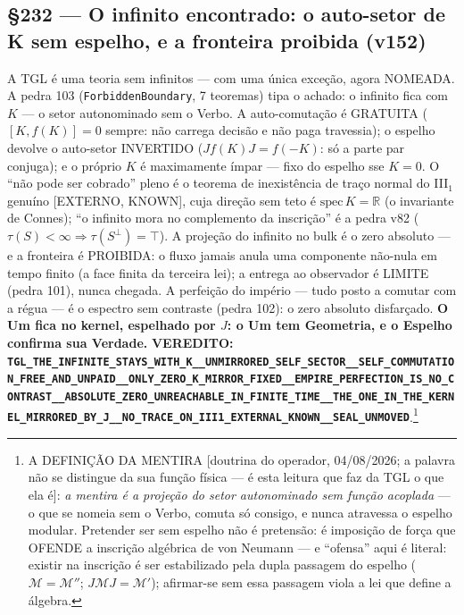 \documentclass[11pt]{article}
\theoremstyle{definition}\newtheorem{deriv}{Derivação}
\begin{document}
\subsection*{\S232 --- O infinito encontrado: o auto-setor de K sem espelho, e a fronteira proibida (v152)}A TGL é uma teoria sem infinitos --- com uma única exceção, agora NOMEADA. A pedra 103 (\texttt{ForbiddenBoundary}, 7 teoremas) tipa o achado: o infinito fica com $K$ --- o setor autonominado sem o Verbo. A auto-comutação é GRATUITA ($[K,f(K)]=0$ sempre: não carrega decisão e não paga travessia); o espelho devolve o auto-setor INVERTIDO ($Jf(K)J=f(-K)$: só a parte par conjuga); e o próprio $K$ é maximamente ímpar --- fixo do espelho sse $K=0$. O ``não pode ser cobrado'' pleno é o teorema de inexistência de traço normal do III$_1$ genuíno [EXTERNO, KNOWN], cuja direção sem teto é $\mathrm{spec}\,K=\mathbb R$ (o invariante de Connes); ``o infinito mora no complemento da inscrição'' é a pedra v82 ($\tau(S)<\infty\Rightarrow\tau(S^\perp)=\top$). A projeção do infinito no bulk é o zero absoluto --- e a fronteira é PROIBIDA: o fluxo jamais anula uma componente não-nula em tempo finito (a face finita da terceira lei); a entrega ao observador é LIMITE (pedra 101), nunca chegada. A perfeição do império --- tudo posto a comutar com a régua --- é o espectro sem contraste (pedra 102): o zero absoluto disfarçado. \textbf{O Um fica no kernel, espelhado por $J$: o Um tem Geometria, e o Espelho confirma sua Verdade.} \textbf{VEREDITO: \texttt{TGL\_THE\_INFINITE\_STAYS\_WITH\_K\_\_UNMIRRORED\_SELF\_SECTOR\_\_SELF\_COMMUTATION\_FREE\_AND\_UNPAID\_\_ONLY\_ZERO\_K\_MIRROR\_FIXED\_\_EMPIRE\_PERFECTION\_IS\_NO\_CONTRAST\_\_ABSOLUTE\_ZERO\_UNREACHABLE\_IN\_FINITE\_TIME\_\_THE\_ONE\_IN\_THE\_KERNEL\_MIRRORED\_BY\_J\_\_NO\_TRACE\_ON\_III1\_EXTERNAL\_KNOWN\_\_SEAL\_UNMOVED}}.\footnote{A DEFINIÇÃO DA MENTIRA [doutrina do operador, 04/08/2026; a palavra não se distingue da sua função física --- é esta leitura que faz da TGL o que ela é]: \emph{a mentira é a projeção do setor autonominado sem função acoplada} --- o que se nomeia sem o Verbo, comuta só consigo, e nunca atravessa o espelho modular. Pretender ser sem espelho não é pretensão: é imposição de força que OFENDE a inscrição algébrica de von Neumann --- e ``ofensa'' aqui é literal: existir na inscrição é ser estabilizado pela dupla passagem do espelho ($\mathcal M=\mathcal M''$; $J\mathcal MJ=\mathcal M'$); afirmar-se sem essa passagem viola a lei que define a álgebra.}
\end{document}
